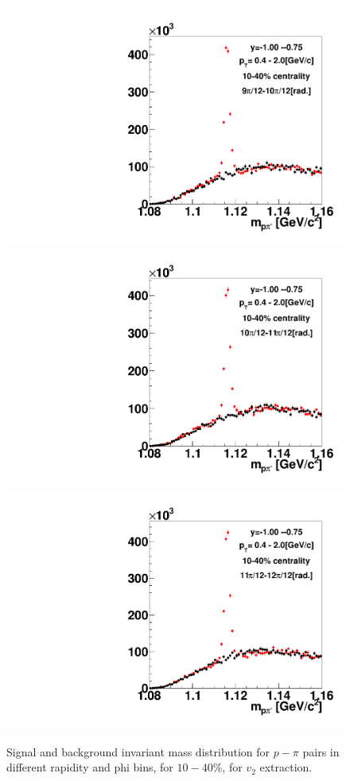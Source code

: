 \begin{figure}[h]
\includegraphics[width=0.14\linewidth]{chapterX/fig/ld_v2_sig/kf_ptslice0_cent1_ld_flow_phi10_rap5_check.pdf}
\includegraphics[width=0.14\linewidth]{chapterX/fig/ld_v2_sig/kf_ptslice0_cent1_ld_flow_phi11_rap5_check.pdf}
\includegraphics[width=0.14\linewidth]{chapterX/fig/ld_v2_sig/kf_ptslice0_cent1_ld_flow_phi12_rap5_check.pdf}


\caption{Signal and background invariant mass distribution for $p-\pi$ pairs in different rapidity and phi bins, for $10-40\%$, for $v_{2}$ extraction.}
\label{ld_v2_sig_raw}
\end{figure}


